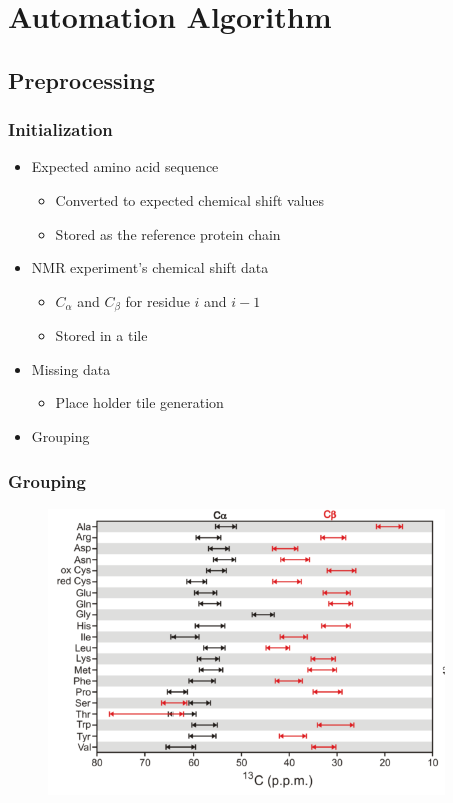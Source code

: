 \documentclass{beamer}
\begin{document}
\section{Automation Algorithm}

\subsection{Preprocessing}

\begin{frame}
	\frametitle{Initialization}
	\begin{itemize}
		\item Expected amino acid sequence
		\begin{itemize}
			\item Converted to expected chemical shift values
			\item Stored as the reference protein chain
		\end{itemize}
		\item NMR experiment's chemical shift data
		\begin{itemize}
			\item $C_\alpha$ and $C_{\beta}$ for residue $i$ and $i-1$
			\item Stored in a tile
		\end{itemize}
		\item Missing data
		\begin{itemize}
			\item Place holder tile generation
		\end{itemize}
		\item Grouping 
	\end{itemize}
\end{frame}

\begin{frame}
	\frametitle{Grouping}
	\begin{figure}[H]
	\begin{center}
	\includegraphics[width=.65\textwidth]{carbon}
	\end{center}
	\end{figure}
\hfill \scriptsize\cite{carbon}
\end{frame}
\end{document}
